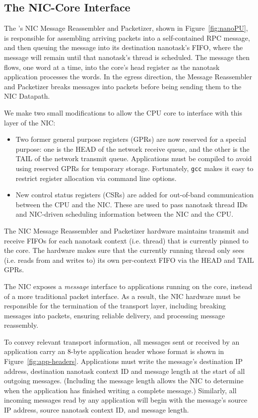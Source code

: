 \subsection{The NIC-Core Interface}
\label{ssec:niccore-interface}
The \name{}'s NIC Message Reassembler and Packetizer, shown in Figure~\ref{fig:nanoPU}, is responsible for assembling arriving packets into a self-contained RPC message, and then queuing the message into its destination nanotask's FIFO, where the message will remain until that nanotask's thread is scheduled. The message then flows, one word at a time, into the core's head register as the nanotask application processes the words. In the egress direction, the Message Reassembler and Packetizer breaks messages into packets before being sending them to the NIC Datapath.

We make two small modifications to allow the CPU core to interface with this layer of the NIC:
\begin{itemize}
    \item Two former general purpose registers (GPRs) are now reserved for a special purpose: one is the HEAD of the network receive queue, and the other is the TAIL of the network transmit queue. Applications must be compiled to avoid using reserved GPRs for temporary storage. Fortunately, \texttt{gcc} makes it easy to restrict register allocation via command line options.
    \item New control status registers (CSRs) are added for out-of-band communication between the CPU and the NIC. These are used to pass nanotask thread IDs and NIC-driven scheduling information between the NIC and the CPU. 
\end{itemize}

The NIC Message Reassembler and Packetizer hardware maintains transmit and receive FIFOs for each nanotask context (i.e. thread) that is currently pinned to the core. The hardware makes sure that the currently running thread only sees (i.e. reads from and writes to) its own per-context FIFO via the HEAD and TAIL GPRs.

The NIC exposes a {\em message} interface to applications running on the core, instead of a more traditional packet interface.
As a result, the \name{} NIC hardware must be responsible for the termination of the transport layer, including breaking messages into packets, ensuring reliable delivery, and processing message reassembly.

To convey relevant transport information, all messages sent or received by an application carry an 8-byte application header whose format is shown in Figure~\ref{fig:app-headers}. Applications must write the message's destination IP address, destination nanotask context ID and message length at the start of all outgoing messages. (Including the message length allows the NIC to determine when the application has finished writing a complete message.) Similarly, all incoming messages read by any application will begin with the message's source IP address, source nanotask context ID, and message length.

